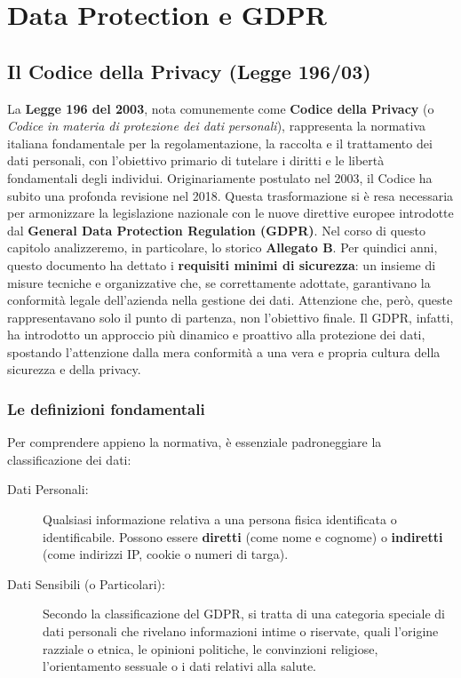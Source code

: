 \chapter{Data Protection e GDPR}

\section{Il Codice della Privacy (Legge 196/03)}

La \textbf{Legge 196 del 2003}, nota comunemente come \textbf{Codice della Privacy} (o \textit{Codice in materia di protezione dei dati personali}), rappresenta la normativa italiana fondamentale per la regolamentazione, la raccolta e il trattamento dei dati personali, con l'obiettivo primario di tutelare i diritti e le libertà fondamentali degli individui.
Originariamente postulato nel 2003, il Codice ha subito una profonda revisione nel 2018. Questa trasformazione si è resa necessaria per armonizzare la legislazione nazionale con le nuove direttive europee introdotte dal \textbf{General Data Protection Regulation (GDPR)}.
Nel corso di questo capitolo analizzeremo, in particolare, lo storico \textbf{Allegato B}.
Per quindici anni, questo documento ha dettato i \textbf{requisiti minimi di sicurezza}: un insieme di misure tecniche e organizzative che, se correttamente adottate, garantivano la conformità legale dell'azienda nella gestione dei dati.
Attenzione che, però, queste rappresentavano solo il punto di partenza, non l'obiettivo finale.
Il GDPR, infatti, ha introdotto un approccio più dinamico e proattivo alla protezione dei dati, spostando l'attenzione dalla mera conformità a una vera e propria cultura della sicurezza e della privacy.
\subsection*{Le definizioni fondamentali}

Per comprendere appieno la normativa, è essenziale padroneggiare la classificazione dei dati:

\begin{description}
    \item[Dati Personali:] Qualsiasi informazione relativa a una persona fisica identificata o identificabile.
    Possono essere \textbf{diretti} (come nome e cognome) o \textbf{indiretti} (come indirizzi IP, cookie o numeri di targa).
    \item[Dati Sensibili (o Particolari):] Secondo la classificazione del GDPR, si tratta di una categoria speciale di dati personali che rivelano informazioni intime o riservate, quali l'origine razziale o etnica, le opinioni politiche, le convinzioni religiose, l'orientamento sessuale o i dati relativi alla salute.
\end{description}

